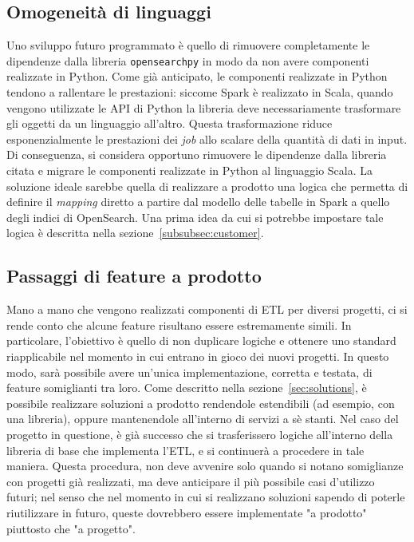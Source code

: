 \subsection{Omogeneità di linguaggi}\label{subsec:future-cat}
Uno sviluppo futuro programmato è quello di rimuovere completamente le dipendenze dalla libreria \texttt{opensearchpy} in modo da non avere componenti realizzate in Python.
Come già anticipato, le componenti realizzate in Python tendono a rallentare le prestazioni:
siccome Spark è realizzato in Scala, quando vengono utilizzate le API di Python la libreria deve necessariamente trasformare gli oggetti da un linguaggio all'altro.
Questa trasformazione riduce esponenzialmente le prestazioni dei \textit{job} allo scalare della quantità di dati in input.
Di conseguenza, si considera opportuno rimuovere le dipendenze dalla libreria citata e migrare le componenti realizzate in Python al linguaggio Scala.
La soluzione ideale sarebbe quella di realizzare a prodotto una logica che permetta di definire il \textit{mapping} diretto a partire dal modello delle tabelle in Spark a quello degli indici di OpenSearch.
Una prima idea da cui si potrebbe impostare tale logica è descritta nella sezione~\ref{subsubsec:customer}.

\subsection{Passaggi di feature a prodotto}\label{subsec:future-customer}
Mano a mano che vengono realizzati componenti di ETL per diversi progetti, ci si rende conto che alcune feature risultano essere estremamente simili.
In particolare, l'obiettivo è quello di non duplicare logiche e ottenere uno standard riapplicabile nel momento in cui entrano in gioco dei nuovi progetti.
In questo modo, sarà possibile avere un'unica implementazione, corretta e testata, di feature somiglianti tra loro.
Come descritto nella sezione~\ref{sec:solutions}, è possibile realizzare soluzioni a prodotto rendendole estendibili (ad esempio, con una libreria), oppure mantenendole all'interno di servizi a sè stanti.
Nel caso del progetto in questione, è già successo che si trasferissero logiche all'interno della libreria di base che implementa l'ETL, e si continuerà a procedere in tale maniera.
Questa procedura, non deve avvenire solo quando si notano somiglianze con progetti già realizzati, ma deve anticipare il più possibile casi d'utilizzo futuri;
nel senso che nel momento in cui si realizzano soluzioni sapendo di poterle riutilizzare in futuro, queste dovrebbero essere implementate "a prodotto" piuttosto che "a progetto".

